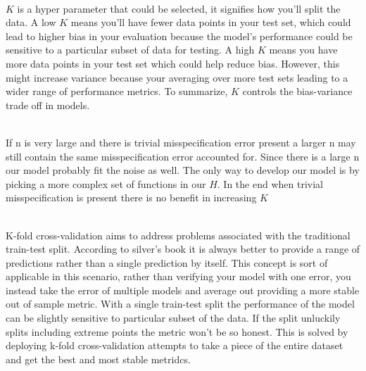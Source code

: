 \documentclass[12pt]{article}
\begin{document}
\begin{enumerate}

 \\ 
\(K\) is a hyper parameter that could be selected, it signifies how you'll split the data. A low \(K\) means you'll have fewer data points in your test set, which could lead to higher bias in your evaluation because the model's performance could be sensitive to a particular subset of data for testing. A high \(K\) means you have more data points in your test set which could help reduce bias. However, this might increase variance because your averaging over more test sets leading to a wider range of performance metrics. To summarize, \(K\) controls the bias-variance trade off in models.

 \\ 
If n is very large and there is trivial misspecification error present a larger n may still contain the same misspecification error accounted for. Since there is a large n our model probably fit the noise as well. The only way to develop our model is by picking a more complex set of functions in our \(H\). In the end when trivial misspecification is present there is no benefit in increasing \(K\)

  \\ 
K-fold cross-validation aims to address problems associated with the traditional train-test split. According to silver's book it is always better to provide a range of predictions rather than a single prediction by itself. This concept is sort of applicable in this scenario, rather than verifying your model with one error, you instead take the error of multiple models and average out providing a more stable out of sample metric. With a single train-test split the performance of the model can be slightly sensitive to particular subset of the data. If the split unluckily splits including extreme points the metric won't be so honest. This is solved by deploying k-fold cross-validation attempts to take a piece of the entire dataset and get the best and most stable metridcs.



\end{enumerate}
\end{document}

